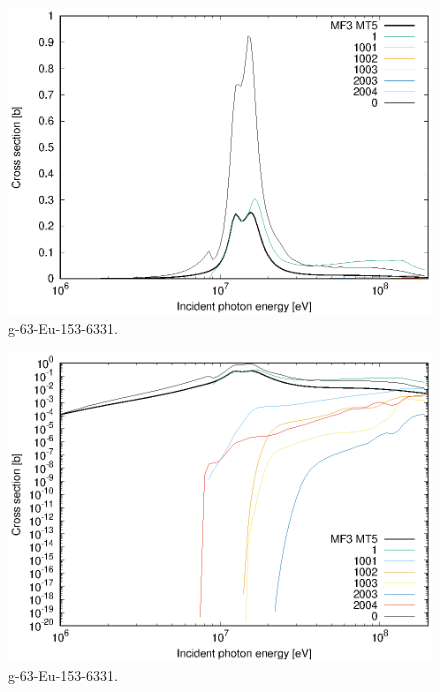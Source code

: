 \begin{figure}
 \includegraphics[width=\linewidth]{eps/g_63-Eu-153_6331.eps}
  \caption{g-63-Eu-153-6331.}
\end{figure}
\begin{figure}
 \includegraphics[width=\linewidth]{eps-log/g_63-Eu-153_6331.eps}
 \caption{g-63-Eu-153-6331.}
\end{figure}
\newpage \clearpage

